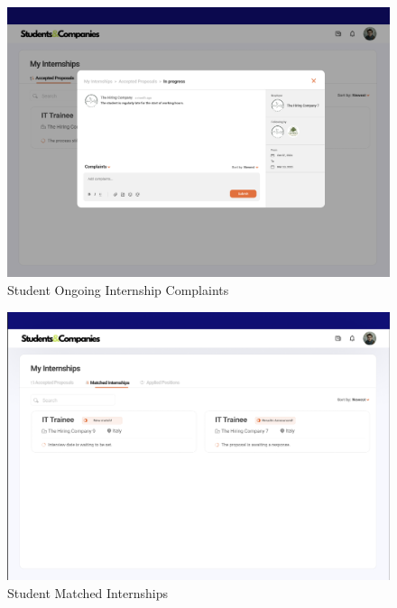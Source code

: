 \documentclass{article}
\begin{document}
\begin{figure}[H]
    \centering
    \includegraphics[scale = 0.42]{figures/UserInterfaces/Student/Complaints.png}
    \caption{Student Ongoing Internship Complaints}
     \centering
\end{figure}
\begin{figure}[H]
    \centering
    \includegraphics[scale = 0.42]{figures/UserInterfaces/Student/MatchedInternships.png}
    \caption{Student Matched Internships}
     \centering
\end{figure}
\end{document}
